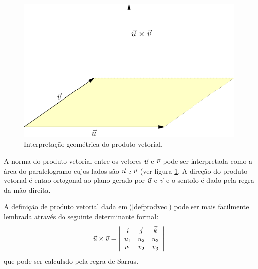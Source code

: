 \begin{figure}%
     \includegraphics[width=\textwidth]{./cap_algvet/pics/prod_vec_paralelogramo}
      \caption{Interpretação geométrica do produto vetorial.}\label{fig:prod_paralelo}
  \end{figure}

  A norma do produto vetorial entre os vetores $\vec{u}$ e $\vec{v}$ pode ser interpretada como a área do paralelogramo cujos lados são $\vec{u}$ e $\vec{v}$ (ver figura \ref{fig:prod_paralelo}. A direção do produto vetorial é então ortogonal ao plano gerado por  $\vec{u}$ e $\vec{v}$  e o sentido é dado pela regra da mão direita.




A definição de produto vetorial dada em (\ref{defprodvec}) pode ser mais facilmente lembrada através do seguinte determinante formal:
\begin{equation}\label{detprodvec}
\vec{u}\times\vec{v}=\left|\begin{array}{ccc}
\vec{i}&\vec{j}&\vec{k}\\
u_1 & u_2 & u_3\\
v_1 & v_2 & v_3\\
\end{array}
\right|
\end{equation}
que pode ser calculado pela regra de Sarrus.

